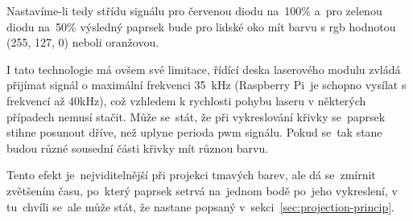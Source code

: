 Nastavíme-li tedy střídu signálu pro červenou diodu na~100\% a~pro zelenou diodu na~50\% výsledný paprsek bude pro lidské oko mít barvu s rgb hodnotou (255, 127, 0) neboli oranžovou.

I tato technologie má ovšem své limitace, řídící deska laserového modulu zvládá přijímat signál o maximální frekvenci 35~kHz (Raspberry Pi~je schopno vysílat s frekvencí až 40kHz), což vzhledem k rychlosti pohybu laseru v některých případech nemusí stačit.
Může se~stát, že při vykreslování křivky se~paprsek stihne posunout dříve, než uplyne perioda pwm signálu. Pokud se~tak stane budou různé sousední části křivky mít různou barvu.


Tento efekt je~nejviditelnější při projekci tmavých barev, ale dá se~zmírnit zvětšením času, po~který paprsek setrvá na~jednom bodě po~jeho vykreslení, v tu~chvíli se~ale může stát, že nastane  popsaný v~sekci~\ref{sec:projection-princip}.